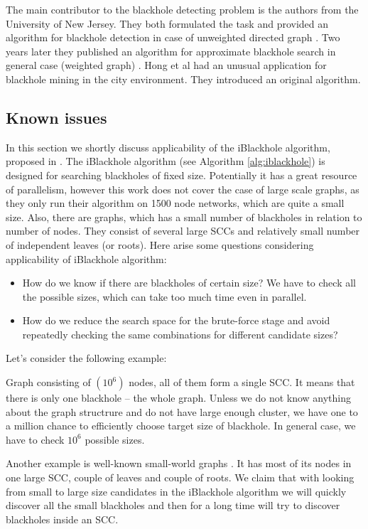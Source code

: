 \documentclass{svproc}
\begin{document}
The main contributor to the blackhole detecting problem is the authors from the University of New Jersey. They both formulated the task and provided an algorithm for blackhole detection in case of unweighted directed graph \cite{li2010detecting}. 
Two years later they published an algorithm for approximate blackhole search in general case (weighted graph) \cite{li2012mining,li2014mining}. 
Hong et al \cite{hong2015detecting} had
an unusual application for blackhole mining in the city environment. They introduced an original algorithm.  

\subsection{Known issues}
In this section we shortly discuss applicability of the iBlackhole algorithm, proposed in \cite{li2010detecting}.
The iBlackhole algorithm (see Algorithm \ref{alg:iblackhole}) is designed for searching blackholes of fixed size. Potentially it has a great resource of parallelism, however this work does not cover the case of large scale graphs, as they only run their algorithm on 1500 node networks, which are quite
a small size.
Also, there are graphs, which has a small number of blackholes in relation to number of nodes. They consist
of several large SCCs and relatively small number of independent leaves (or roots). Here arise some questions considering applicability of
iBlackhole algorithm:
\begin{itemize}
\item How do we know if there are blackholes of certain size? We have to check all the possible sizes, which can take too much time even in parallel.
\item How do we reduce the search space for the brute-force stage and avoid repeatedly checking the same combinations for different candidate sizes?
\end{itemize}

Let's consider the following example:

Graph consisting of $(10^6)$ nodes, all of them form a single SCC. It means that there is only one blackhole -- the whole graph.
Unless we do not know anything about the graph structrure and do not have large enough cluster, we have one to a million chance
to efficiently choose target size of blackhole. In general case, we have to check $10^6$ possible sizes.

Another example is well-known small-world graphs \cite{watts1999networks}. It has most of its nodes in one large SCC, couple of leaves and couple of roots.
We claim that with looking from small to large size candidates in the iBlackhole algorithm we will quickly discover all the small blackholes and then for a long time will try to discover blackholes inside an SCC.
\end{document}

